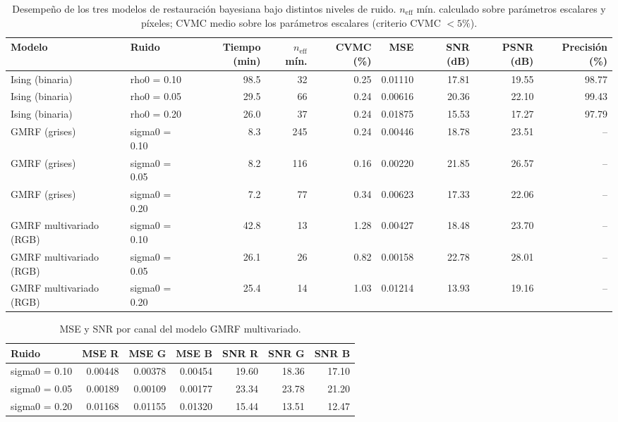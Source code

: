 \begin{table}[htbp]
\centering
\caption{Desempeño de los tres modelos de restauración bayesiana bajo distintos niveles de ruido. $n_{\mathrm{eff}}$ mín. calculado sobre parámetros escalares y píxeles; CVMC medio sobre los parámetros escalares (criterio CVMC $< 5\%$).}
\label{tab:comparativa}
\small
\begin{tabular}{llrrrrrrr}
\hline
Modelo & Ruido & Tiempo (min) & $n_{\mathrm{eff}}$ mín. & CVMC (\%) & MSE & SNR (dB) & PSNR (dB) & Precisión (\%) \\
\hline
Ising (binaria) & rho0 = 0.10 & 98.5 & 32 & 0.25 & 0.01110 & 17.81 & 19.55 & 98.77 \\
Ising (binaria) & rho0 = 0.05 & 29.5 & 66 & 0.24 & 0.00616 & 20.36 & 22.10 & 99.43 \\
Ising (binaria) & rho0 = 0.20 & 26.0 & 37 & 0.24 & 0.01875 & 15.53 & 17.27 & 97.79 \\
GMRF (grises) & sigma0 = 0.10 & 8.3 & 245 & 0.24 & 0.00446 & 18.78 & 23.51 & -- \\
GMRF (grises) & sigma0 = 0.05 & 8.2 & 116 & 0.16 & 0.00220 & 21.85 & 26.57 & -- \\
GMRF (grises) & sigma0 = 0.20 & 7.2 & 77 & 0.34 & 0.00623 & 17.33 & 22.06 & -- \\
GMRF multivariado (RGB) & sigma0 = 0.10 & 42.8 & 13 & 1.28 & 0.00427 & 18.48 & 23.70 & -- \\
GMRF multivariado (RGB) & sigma0 = 0.05 & 26.1 & 26 & 0.82 & 0.00158 & 22.78 & 28.01 & -- \\
GMRF multivariado (RGB) & sigma0 = 0.20 & 25.4 & 14 & 1.03 & 0.01214 & 13.93 & 19.16 & -- \\
\hline
\end{tabular}
\end{table}

\begin{table}[htbp]
\centering
\caption{MSE y SNR por canal del modelo GMRF multivariado.}
\label{tab:rgb_canales}
\small
\begin{tabular}{lrrrrrr}
\hline
Ruido & MSE R & MSE G & MSE B & SNR R & SNR G & SNR B \\
\hline
sigma0 = 0.10 & 0.00448 & 0.00378 & 0.00454 & 19.60 & 18.36 & 17.10 \\
sigma0 = 0.05 & 0.00189 & 0.00109 & 0.00177 & 23.34 & 23.78 & 21.20 \\
sigma0 = 0.20 & 0.01168 & 0.01155 & 0.01320 & 15.44 & 13.51 & 12.47 \\
\hline
\end{tabular}
\end{table}
